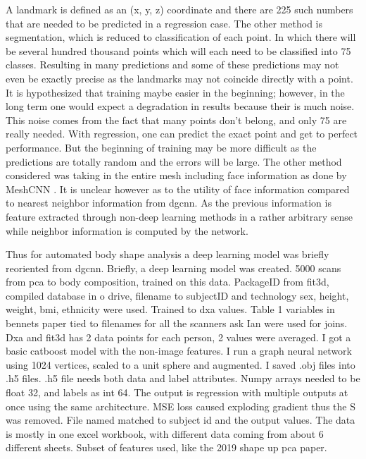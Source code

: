 A landmark is defined as an (x, y, z) coordinate and there are 225 such numbers that are needed to be predicted in a regression case. The other method is segmentation, which is reduced to classification of each point. In which there will be several hundred thousand points which will each need to be classified into 75 classes. Resulting in many predictions and some of these predictions may not even be exactly precise as the landmarks may not coincide directly with a point. It is hypothesized that training maybe easier in the beginning; however, in the long term one would expect a degradation in results because their is much noise. This noise comes from the fact that many points don't belong, and only 75 are really needed. With regression, one can predict the exact point and get to perfect performance. But the beginning of training may be more difficult as the predictions are totally random and the errors will be large.
The other method considered was taking in the entire mesh including face information as done by MeshCNN \cite{hanocka2019meshcnn}. It is unclear however as to the utility of face information compared to nearest neighbor information from dgcnn. As the previous information is feature extracted through non-deep learning methods in a rather arbitrary sense while neighbor information is computed by the network.

Thus for automated body shape analysis a deep learning model was briefly reoriented from dgcnn. Briefly, a deep learning model was created. 5000 scans from pca to body composition, trained on this data. PackageID from fit3d, compiled database in o drive, filename to subjectID and technology sex, height, weight, bmi, ethnicity were used. Trained to dxa values. Table 1 variables in bennets paper tied to filenames for all the scanners ask Ian were used for joins. Dxa and fit3d has 2 data points for each person, 2 values were averaged. I got a basic catboost model with the non-image features. I run a graph neural network using 1024 vertices, scaled to a unit sphere and augmented. I saved .obj files into .h5 files. .h5 file needs both data and label attributes. Numpy arrays needed to be float 32, and labels as int 64. The output is regression with multiple outputs at once using the same architecture. MSE loss caused exploding gradient thus the S was removed. File named matched to subject id and the output values. The data is mostly in one excel workbook, with different data coming from about 6 different sheets. Subset of features used, like the 2019 shape up pca paper.

